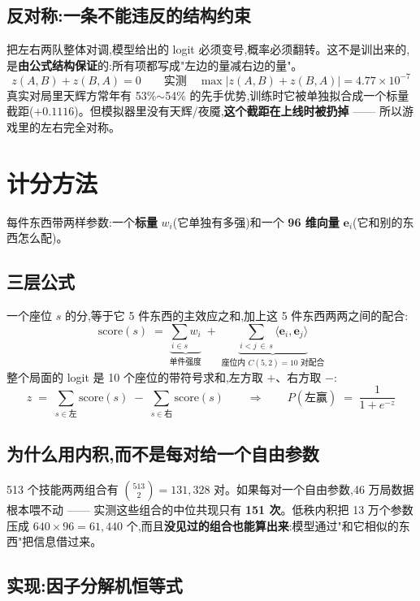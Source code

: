 \documentclass[11pt,a4paper]{article}
\begin{document}
\subsection{反对称:一条不能违反的结构约束}

把左右两队整体对调,模型给出的 logit 必须变号,概率必须翻转。这不是训出来的,是\textbf{由公式结构保证}的:所有项都写成"左边的量减右边的量"。
\[
z(A,B) + z(B,A) = 0
\qquad\text{实测}\quad \max\bigl|z(A,B)+z(B,A)\bigr| = 4.77\times10^{-7}
\]
真实对局里天辉方常年有 53\%$\sim$54\% 的先手优势,训练时它被单独拟合成一个标量截距($+0.1116$)。但模拟器里没有天辉/夜魇,\textbf{这个截距在上线时被扔掉} —— 所以游戏里的左右完全对称。

\section{计分方法}

每件东西带两样参数:一个\textbf{标量} $w_i$(它单独有多强)和一个 \textbf{96 维向量} $\mathbf{e}_i$(它和别的东西怎么配)。

\subsection{三层公式}

一个座位 $s$ 的分,等于它 5 件东西的主效应之和,加上这 5 件东西两两之间的配合:
\[
\mathrm{score}(s)\;=\;\underbrace{\sum_{i\in s} w_i}_{\text{单件强度}}\;+\;\underbrace{\sum_{i<j\,\in\, s}\langle \mathbf{e}_i,\mathbf{e}_j\rangle}_{\text{座位内 }C(5,2)=10\text{ 对配合}}
\]
整个局面的 logit 是 10 个座位的带符号求和,左方取 $+$、右方取 $-$:
\[
z \;=\; \sum_{s\in \text{左}}\mathrm{score}(s)\;-\;\sum_{s\in \text{右}}\mathrm{score}(s)
\qquad\Longrightarrow\qquad
P(\text{左赢}) \;=\; \frac{1}{1+e^{-z}}
\]

\subsection{为什么用内积,而不是每对给一个自由参数}

513 个技能两两组合有 $\binom{513}{2}=131{,}328$ 对。如果每对一个自由参数,46 万局数据根本喂不动 —— 实测这些组合的中位共现只有 \textbf{151 次}。低秩内积把 13 万个参数压成 $640\times96=61{,}440$ 个,而且\textbf{没见过的组合也能算出来}:模型通过"和它相似的东西"把信息借过来。

\subsection{实现:因子分解机恒等式}
\end{document}
